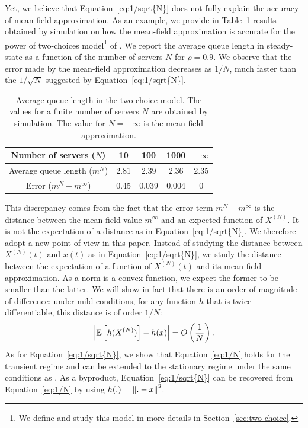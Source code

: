 \documentclass[sigconf]{acmart}
\newcommand\XN{X^{(N)}}
\newcommand\esp[1]{{\mathchoice{\besp{#1}}{\sesp{#1}}{\sesp{#1}}{\sesp{#1}}}}
\newcommand\besp[1]{\mathbb{E}\left[#1\right]}
\newcommand\sesp[1]{\mathbb{E}[#1]}
\newcommand\norm[1]{{\mathchoice{\bnorm{#1}}{\snorm{#1}}{\snorm{#1}}{\snorm{#1}}}}
\newcommand\bnorm[1]{\left\|#1\right\|}
\newcommand\snorm[1]{\|#1\|}
\newcommand\abs[1]{\left|#1\right|}
\newcommand\p[1]{\left(#1\right)}
\begin{document}
Yet, we believe that Equation~\eqref{eq:1/sqrt{N}} does not fully
explain the accuracy of mean-field approximation. As an example, we
provide in Table~\ref{tab:power2} results obtained by simulation on
how the mean-field approximation is accurate for the power of
two-choices model\footnote{We define and study this model in more
  details in Section~\ref{sec:two-choice}.} of
\cite{mitzenmacher1996power,vvedenskaya1996queueing}. We report the
average queue length in steady-state as a function of the number of
servers $N$ for $\rho=0.9$. We observe that the error made by the
mean-field approximation decreases as $1/N$, much faster than the
$1/\sqrt{N}$ suggested by Equation~\eqref{eq:1/sqrt{N}}.

\begin{table}[ht]
  \centering
  \begin{tabular}{|c|c|c|c|c|}
    \hline
    Number of servers ($N$) & 10 & 100 & 1000 &$+\infty$\\\hline
    Average queue length ($m^N$) &2.81&2.39&2.36& 2.35\\\hline
    Error ($m^N-m^\infty$) & 0.45 & 0.039 & 0.004 & 0 \\\hline
  \end{tabular}
  \caption{Average queue length in the two-choice model. The values for a
    finite number of servers
    $N$ are obtained by simulation. The value for $N=+\infty$ is the
    mean-field approximation. }
  \label{tab:power2}
\end{table}

This discrepancy comes from the fact that the error term
$m^N-m^\infty$ is the distance between the mean-field value $m^\infty$
and an expected function of $\XN$. It is not the expectation of a
distance as in Equation~\eqref{eq:1/sqrt{N}}. We therefore adopt a new
point of view in this paper. Instead of studying the distance between
$\XN(t)$ and $x(t)$ as in Equation~\eqref{eq:1/sqrt{N}}, we study the
distance between the expectation of a function of $\XN(t)$ and its
mean-field approximation.  As a norm is a convex function, we expect
the former to be smaller than the latter. We will show in fact that
there is an order of magnitude of difference: under mild conditions,
for any function $h$ that is twice differentiable, this distance is of
order $1/N$:
\begin{align}
  \label{eq:1/N}
  \abs{\esp{h(\XN)} - h(x)} = O\p{\frac1N}.
\end{align}
As for Equation~\eqref{eq:1/sqrt{N}}, we show that
Equation~\eqref{eq:1/N} holds for the transient regime and can be
extended to the stationary regime under the same conditions as
\cite{ying2016rate}.  As a byproduct, Equation~\eqref{eq:1/sqrt{N}}
can be recovered from Equation~\eqref{eq:1/N} by using
$h(.)=\norm{.-x}^2$.
\end{document}
